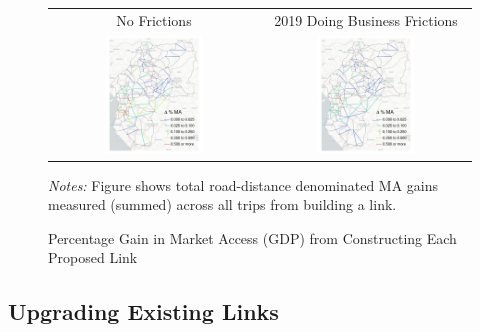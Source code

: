 \documentclass[a4paper]{article}
\begin{document}
\begin{figure}[H]  \vspace{-1mm}
\centering
\caption{\label{fig:MA_DA_TAN} Percentage Gain in Market Access (GDP) from Constructing Each Proposed Link}
\vspace{2mm}
\begin{tabular}{cc}
No Frictions & 2019 Doing Business Frictions \\
\includegraphics[width=0.48\textwidth]{"../figures/PE/trans_CEMAC_network_MA_gain_perc.pdf"} &
\includegraphics[width=0.48\textwidth]{"../figures/PE/trans_CEMAC_network_MA_gain_perc_bc.pdf"}  \\ [-0.2em]
\end{tabular}
\scriptsize 
\emph{Notes:} Figure shows total road-distance denominated MA gains measured (summed) across all trips from building a link. 
\end{figure}

\subsection{Upgrading Existing Links}
\end{document}
